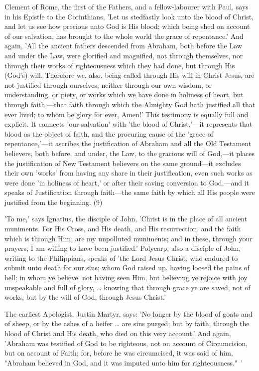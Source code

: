 \documentclass[
]{book}
\begin{document}
Clement of Rome, the first of the Fathers, and a fellow-labourer with Paul, says in his Epistle to the Corinthians, 'Let us stedfastly look unto the blood of Christ, and let us see how precious unto God is His blood; which being shed on account of our salvation, has brought to the whole world the grace of repentance.' And again, 'All the ancient fathers descended from Abraham, both before the Law and under the Law, were glorified and magnified, not through themselves, nor through their works of righteousness which they had done, but through His (God's) will. Therefore we, also, being called through His will in Christ Jesus, are not justified through ourselves, neither through our own wisdom, or understanding, or piety, or works which we have done in holiness of heart, but through faith,---that faith through which the Almighty God hath justified all that ever lived; to whom be glory for ever, Amen!' This testimony is equally full and explicit. It connects 'our salvation' with 'the blood of Christ,'---it represents that blood as the object of faith, and the procuring cause of the 'grace of repentance,'---it ascribes the justification of Abraham and all the Old Testament believers, both before, and under, the Law, to the gracious will of God,---it places the justification of New Testament believers on the same ground---it excludes their own 'works' from having any share in their justification, even such works as were done 'in holiness of heart,' or after their saving conversion to God,---and it speaks of Justification through faith---the same faith by which all His people were justified from the beginning. (9)

'To me,' says Ignatius, the disciple of John, 'Christ is in the place of all ancient muniments. For His Cross, and His death, and His resurrection, and the faith which is through Him, are my unpolluted muniments; and in these, through your prayers, I am willing to have been justified.' Polycarp, also a disciple of John, writing to the Philippians, speaks of 'the Lord Jesus Christ, who endured to submit unto death for our sins; whom God raised up, having loosed the pains of hell; in whom ye believe, not having seen Him, but believing ye rejoice with joy unspeakable and full of glory, \ldots{} knowing that through grace ye are saved, not of works, but by the will of God, through Jesus Christ.'

The earliest Apologist, Justin Martyr, says: 'No longer by the blood of goats and of sheep, or by the ashes of a heifer \ldots{} are sins purged; but by faith, through the blood of Christ and His death, who died on this very account.' And again, 'Abraham was testified of God to be righteous, not on account of Circumcision, but on account of Faith; for, before he was circumcised, it was said of him, "Abraham believed in God, and it was imputed unto him for righteousness."~'
\end{document}
